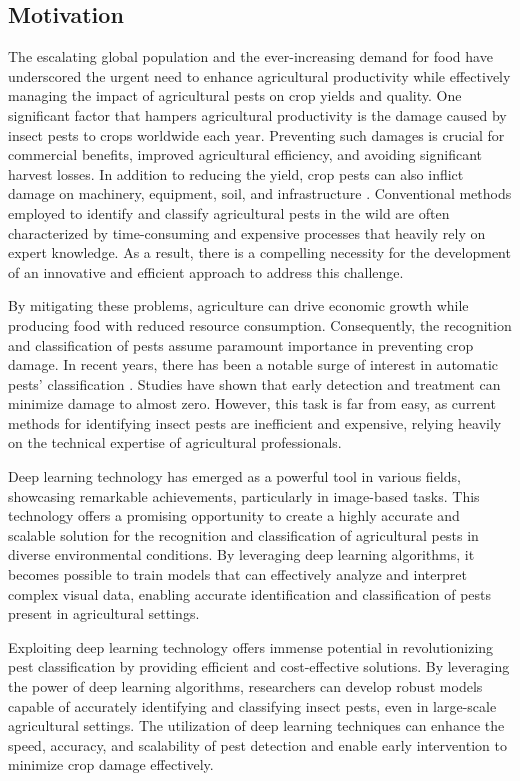 \subsection{Motivation}
The escalating global population and the ever-increasing demand for food have underscored the urgent need to enhance agricultural productivity while effectively managing the impact of agricultural pests on crop yields and quality. One significant factor that hampers agricultural productivity is the damage caused by insect pests to crops worldwide each year. Preventing such damages is crucial for commercial benefits, improved agricultural efficiency, and avoiding significant harvest losses. In addition to reducing the yield, crop pests can also inflict damage on machinery, equipment, soil, and infrastructure \cite{kandalkar2014classification}. Conventional methods employed to identify and classify agricultural pests in the wild are often characterized by time-consuming and expensive processes that heavily rely on expert knowledge. As a result, there is a compelling necessity for the development of an innovative and efficient approach to address this challenge.

By mitigating these problems, agriculture can drive economic growth while producing food with reduced resource consumption. Consequently, the recognition and classification of pests assume paramount importance in preventing crop damage. In recent years, there has been a notable surge of interest in automatic pests' classification \cite{xia2018insect}. Studies have shown that early detection and treatment can minimize damage to almost zero. However, this task is far from easy, as current methods for identifying insect pests are inefficient and expensive, relying heavily on the technical expertise of agricultural professionals.

Deep learning technology has emerged as a powerful tool in various fields, showcasing remarkable achievements, particularly in image-based tasks. This technology offers a promising opportunity to create a highly accurate and scalable solution for the recognition and classification of agricultural pests in diverse environmental conditions. By leveraging deep learning algorithms, it becomes possible to train models that can effectively analyze and interpret complex visual data, enabling accurate identification and classification of pests present in agricultural settings.

Exploiting deep learning technology offers immense potential in revolutionizing pest classification by providing efficient and cost-effective solutions. By leveraging the power of deep learning algorithms, researchers can develop robust models capable of accurately identifying and classifying insect pests, even in large-scale agricultural settings. The utilization of deep learning techniques can enhance the speed, accuracy, and scalability of pest detection and enable early intervention to minimize crop damage effectively.

